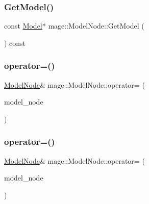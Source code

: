 \subsubsection{\texorpdfstring{Get\+Model()}{GetModel()}\hspace{0.1cm}{\footnotesize\ttfamily [2/2]}}
{\footnotesize\ttfamily const \hyperlink{classmage_1_1_model}{Model}$\ast$ mage\+::\+Model\+Node\+::\+Get\+Model (\begin{DoxyParamCaption}{ }\end{DoxyParamCaption}) const}

\hypertarget{classmage_1_1_model_node_ad8378279b79930dfe98d176dbc1c5db9}{}\label{classmage_1_1_model_node_ad8378279b79930dfe98d176dbc1c5db9} 
\subsubsection{\texorpdfstring{operator=()}{operator=()}\hspace{0.1cm}{\footnotesize\ttfamily [1/2]}}
{\footnotesize\ttfamily \hyperlink{classmage_1_1_model_node}{Model\+Node}\& mage\+::\+Model\+Node\+::operator= (\begin{DoxyParamCaption}\item[{const \hyperlink{classmage_1_1_model_node}{Model\+Node} \&}]{model\+\_\+node }\end{DoxyParamCaption})\hspace{0.3cm}{\ttfamily [delete]}}

\hypertarget{classmage_1_1_model_node_ad39321f4d392aa4e28169b8d7a08af68}{}\label{classmage_1_1_model_node_ad39321f4d392aa4e28169b8d7a08af68} 
\subsubsection{\texorpdfstring{operator=()}{operator=()}\hspace{0.1cm}{\footnotesize\ttfamily [2/2]}}
{\footnotesize\ttfamily \hyperlink{classmage_1_1_model_node}{Model\+Node}\& mage\+::\+Model\+Node\+::operator= (\begin{DoxyParamCaption}\item[{\hyperlink{classmage_1_1_model_node}{Model\+Node} \&\&}]{model\+\_\+node }\end{DoxyParamCaption})\hspace{0.3cm}{\ttfamily [delete]}}



